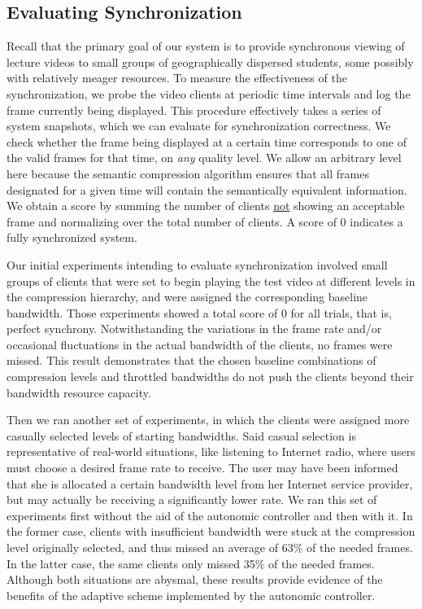\documentclass{sig-alternate}
\begin{document}
\subsection{Evaluating Synchronization}

Recall that the primary goal of our system is to provide synchronous
viewing of lecture videos to small groups of geographically dispersed
students, some possibly with relatively meager resources.  To measure
the effectiveness of the synchronization, we probe the video clients
at periodic time intervals and log the frame currently being
displayed.  This procedure effectively takes a series of system
snapshots, which we can evaluate for synchronization correctness.  We
check whether the frame being displayed at a certain time corresponds
to one of the valid frames for that time, on {\em any} quality level.
We allow an arbitrary level here because the semantic compression
algorithm ensures that all frames designated for a given time will
contain the semantically equivalent information.  We obtain a score by
summing the number of clients \underline{not} showing an acceptable
frame and normalizing over the total number of clients.  A score of 0
indicates a fully synchronized system.

Our initial experiments intending to evaluate synchronization involved
small groups of clients that were set to begin playing the test video
at different levels in the compression hierarchy, and were assigned
the corresponding baseline bandwidth. Those experiments showed a total
score of 0 for all trials, that is, perfect synchrony. Notwithstanding
the variations in the frame rate and/or occasional fluctuations in the
actual bandwidth of the clients, no frames were missed.  This result
demonstrates that the chosen baseline combinations of compression
levels and throttled bandwidths do not push the clients beyond their
bandwidth resource capacity.

Then we ran another set of experiments, in which the clients were
assigned more casually selected levels of starting bandwidths.  Said
casual selection is representative of real-world situations, like
listening to Internet radio, where users must choose a desired frame
rate to receive.  The user may have been informed that she is
allocated a certain bandwidth level from her Internet service
provider, but may actually be receiving a significantly lower rate.
We ran this set of experiments first without the aid of the autonomic
controller and then with it. In the former case, clients with
insufficient bandwidth were stuck at the compression level originally
selected, and thus missed an average of 63\% of the needed frames.  In
the latter case, the same clients only missed 35\% of the needed
frames.  Although both situations are abysmal, these results provide
evidence of the benefits of the adaptive scheme implemented by the
autonomic controller.
\end{document}
